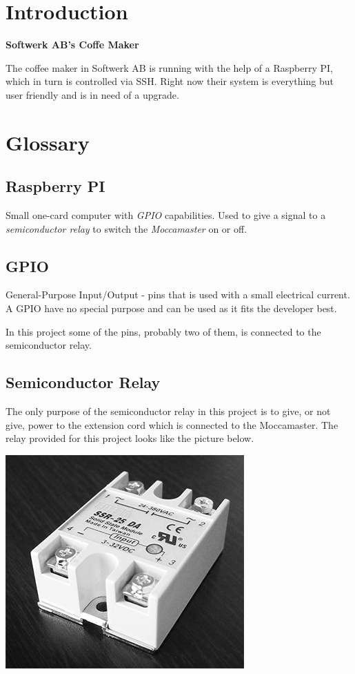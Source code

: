 \section{Introduction}

\textbf{Softwerk AB's Coffe Maker}

The coffee maker in Softwerk AB is running with the help of a Raspberry PI, which in turn is controlled via SSH. Right now their system is everything but user friendly and is in need of a upgrade.

\section{Glossary}

\subsection{Raspberry PI}

Small one-card computer with \textit{GPIO} capabilities. Used to give a signal to a \textit{semiconductor relay} to switch the \textit{Moccamaster} on or off.

\subsection{GPIO}

General-Purpose Input/Output - pins that is used with a small electrical current. A GPIO have no special purpose and can be used as it fits the developer best.

In this project some of the pins, probably two of them, is connected to the semiconductor relay.

\subsection{Semiconductor Relay}

The only purpose of the semiconductor relay in this project is to give, or not give, power to the extension cord which is connected to the Moccamaster. The relay provided for this project looks like the picture below.

\vspace{5mm}
\begin{center}
\includegraphics[scale=0.4]{relay}
\end{center}

